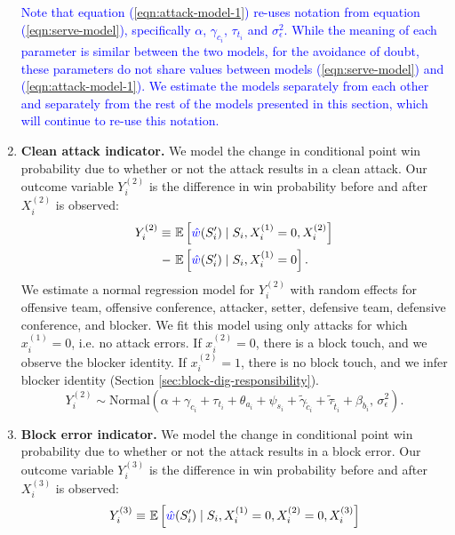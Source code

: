 \documentclass[USenglish]{article}
\theoremstyle{dgthm}
\theoremstyle{dgdef}
\begin{document}
\begin{enumerate}
        \textcolor{blue}{
          Note that equation (\ref{eqn:attack-model-1}) re-uses notation from equation (\ref{eqn:serve-model}), specifically $\alpha$, $\gamma_{c_i}$, $\tau_{t_i}$ and $\sigma^2_\epsilon$. While the meaning of each parameter is similar between the two models, for the avoidance of doubt, these parameters do not share values between models (\ref{eqn:serve-model}) and (\ref{eqn:attack-model-1}). We estimate the models separately from each other and separately from the rest of the models presented in this section, which will continue to re-use this notation.
        }
    \item
        {\bf Clean attack indicator.} We model the change in conditional point win probability due to whether or not the attack results in a clean attack. Our outcome variable $Y_i^{(2)}$ is the difference in win probability before and after $X_i^{(2)}$ is observed:
        \begin{align*}
            Y_i^{(2)} \equiv &~\mathbb{E}\left[\textcolor{blue}{\hat w}(S'_i) \mid S_i, X_i^{(1)} = 0, X_i^{(2)}\right]\\
            - &~\mathbb{E}\left[\textcolor{blue}{\hat w}(S'_i) \mid S_i, X_i^{(1)} = 0\right].
        \end{align*}
        We estimate a normal regression model for $Y_i^{(2)}$ with random effects for offensive team, offensive conference, attacker, setter, defensive team, defensive conference, and blocker. We fit this model using only attacks for which $x_i^{(1)} = 0$, i.e. no attack errors. If $x_i^{(2)} = 0$, there is a block touch, and we observe the blocker identity. If $x_i^{(2)} = 1$, there is no block touch, and we infer blocker identity (Section \ref{sec:block-dig-responsibility}).
        \begin{equation}
        \label{eqn:attack-model-2}
            Y_i^{(2)} \sim \mbox{Normal}\left(
                \alpha + \gamma_{c_i} + \tau_{t_i} + \theta_{a_i} + \psi_{s_i} + \tilde\gamma_{\tilde c_i} + \tilde\tau_{\tilde t_i} + \beta_{b_i},\,
                \sigma^2_\epsilon
            \right).
        \end{equation}
    \item
        {\bf Block error indicator.} We model the change in conditional point win probability due to whether or not the attack results in a block error. Our outcome variable $Y_i^{(3)}$ is the difference in win probability before and after $X_i^{(3)}$ is observed:
        \begin{align*}
            Y_i^{(3)} \equiv &~\mathbb{E}\left[\textcolor{blue}{\hat w}(S'_i) \mid S_i, X_i^{(1)} = 0, X_i^{(2)} = 0, X_i^{(3)}\right]\\

\end{align*}
\end{enumerate}
\end{document}
